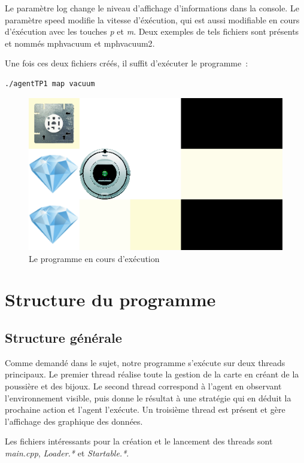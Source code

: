 \documentclass{article}
\begin{document}
Le paramètre log change le niveau d'affichage d'informations dans la console. Le
paramètre speed modifie la vitesse d'éxécution, qui est aussi modifiable en
cours d'éxécution avec les touches \emph{p} et \emph{m}. Deux exemples de tels
fichiers sont présents et nommés mph{vacuum} et mph{vacuum2}.


Une fois ces deux fichiers créés, il suffit d'exécuter le programme~:
\begin{verbatim}
./agentTP1 map vacuum
\end{verbatim}

\begin{figure}[h]
	\begin{center}
		\includegraphics[scale=0.4]{execution}
		\caption{Le programme en cours d'exécution}
		\label{fig:Execution}
	\end{center}
\end{figure}

\section{Structure du programme}
\subsection{Structure générale}
Comme demandé dans le sujet, notre programme s'exécute sur deux threads
principaux. Le premier thread réalise toute la gestion de la carte en créant de
la poussière et des bijoux. Le second thread correspond à l'agent en observant
l'environnement visible, puis donne le résultat à une stratégie qui en déduit la
prochaine action et l'agent l'exécute. Un troisième thread est présent et gère
l'affichage des graphique des données.

Les fichiers intéressants pour la création et le lancement des threads sont
\emph{main.cpp}, \emph{Loader.*} et \emph{Startable.*}.
\end{document}
